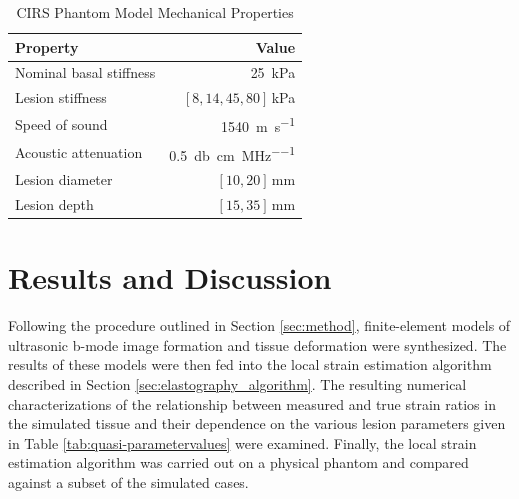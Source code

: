 			\begin{table}[!htb]
				\centering
				\caption{CIRS Phantom Model Mechanical Properties}
				\label{tab:phantomproperties}
				\begin{tabular}{lr}
					\toprule
					Property & Value \\
					\midrule
					Nominal basal stiffness & \SI{25}{\kPa} \\
					Lesion stiffness &  $[8, 14, 45, 80]$\,\si{\kPa} \\
					Speed of sound & \SI{1540}{\metre\per\second} \\
					Acoustic attenuation & \SI{0.5}{\decibel\per\cm\per\MHz} \\
					Lesion diameter & $[10, 20]$\,\si{\mm} \\
					Lesion depth & $[15, 35]$\,\si{\mm} \\
					\bottomrule
				\end{tabular}
			\end{table}

	\section{Results and Discussion}
		Following the procedure outlined in Section \ref{sec:method}, finite-element models of ultrasonic b-mode image formation and tissue deformation were synthesized. The results of these models were then fed into the local strain estimation algorithm described in Section \ref{sec:elastography_algorithm}. The resulting numerical characterizations of the relationship between measured and true strain ratios in the simulated tissue and their dependence on the various lesion parameters given in Table \ref{tab:quasi-parametervalues} were examined. Finally, the local strain estimation algorithm was carried out on a physical phantom and compared against a subset of the simulated cases.

